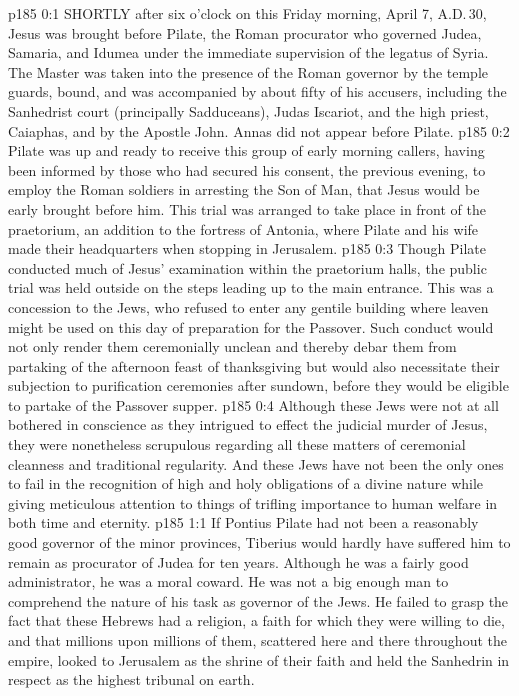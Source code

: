 \vs p185 0:1 SHORTLY after six o’clock on this Friday morning, April 7, A.D.\,30, Jesus was brought before Pilate, the Roman procurator who governed Judea, Samaria, and Idumea under the immediate supervision of the legatus of Syria. The Master was taken into the presence of the Roman governor by the temple guards, bound, and was accompanied by about fifty of his accusers, including the Sanhedrist court (principally Sadduceans), Judas Iscariot, and the high priest, Caiaphas, and by the Apostle John. Annas did not appear before Pilate.
\vs p185 0:2 Pilate was up and ready to receive this group of early morning callers, having been informed by those who had secured his consent, the previous evening, to employ the Roman soldiers in arresting the Son of Man, that Jesus would be early brought before him. This trial was arranged to take place in front of the praetorium, an addition to the fortress of Antonia, where Pilate and his wife made their headquarters when stopping in Jerusalem.
\vs p185 0:3 Though Pilate conducted much of Jesus’ examination within the praetorium halls, the public trial was held outside on the steps leading up to the main entrance. This was a concession to the Jews, who refused to enter any gentile building where leaven might be used on this day of preparation for the Passover. Such conduct would not only render them ceremonially unclean and thereby debar them from partaking of the afternoon feast of thanksgiving but would also necessitate their subjection to purification ceremonies after sundown, before they would be eligible to partake of the Passover supper.
\vs p185 0:4 Although these Jews were not at all bothered in conscience as they intrigued to effect the judicial murder of Jesus, they were nonetheless scrupulous regarding all these matters of ceremonial cleanness and traditional regularity. And these Jews have not been the only ones to fail in the recognition of high and holy obligations of a divine nature while giving meticulous attention to things of trifling importance to human welfare in both time and eternity.
\vs p185 1:1 If Pontius Pilate had not been a reasonably good governor of the minor provinces, Tiberius would hardly have suffered him to remain as procurator of Judea for ten years. Although he was a fairly good administrator, he was a moral coward. He was not a big enough man to comprehend the nature of his task as governor of the Jews. He failed to grasp the fact that these Hebrews had a  religion, a faith for which they were willing to die, and that millions upon millions of them, scattered here and there throughout the empire, looked to Jerusalem as the shrine of their faith and held the Sanhedrin in respect as the highest tribunal on earth.
